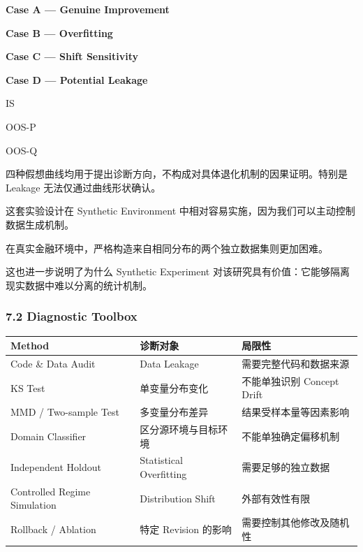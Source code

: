 \textbf{Case A --- Genuine Improvement}


\textbf{Case B --- Overfitting}


\textbf{Case C --- Shift Sensitivity}


\textbf{Case D --- Potential Leakage}


IS

OOS-P

OOS-Q

四种假想曲线均用于提出诊断方向，不构成对具体退化机制的因果证明。特别是 Leakage 无法仅通过曲线形状确认。

这套实验设计在 Synthetic Environment 中相对容易实施，因为我们可以主动控制数据生成机制。

在真实金融环境中，严格构造来自相同分布的两个独立数据集则更加困难。

这也进一步说明了为什么 Synthetic Experiment 对该研究具有价值：它能够隔离现实数据中难以分离的统计机制。

\hypertarget{part-2-23-0001-diagnostic-toolbox}{%
\subsubsection{7.2 Diagnostic Toolbox}\label{part-2-23-0001-diagnostic-toolbox}}

\begin{readertable}
\begin{longtable}[]{@{}
  >{\raggedright\arraybackslash}p{}
  >{\raggedright\arraybackslash}p{}
  >{\raggedright\arraybackslash}p{}@{}}
\toprule
Method & 诊断对象 & 局限性 \\
\midrule
\endhead
Code \& Data Audit & Data Leakage & 需要完整代码和数据来源 \\
KS Test & 单变量分布变化 & 不能单独识别 Concept Drift \\
MMD / Two-sample Test & 多变量分布差异 & 结果受样本量等因素影响 \\
Domain Classifier & 区分源环境与目标环境 & 不能单独确定偏移机制 \\
Independent Holdout & Statistical Overfitting & 需要足够的独立数据 \\
Controlled Regime Simulation & Distribution Shift & 外部有效性有限 \\
Rollback / Ablation & 特定 Revision 的影响 & 需要控制其他修改及随机性 \\
\bottomrule
\end{longtable}
\end{readertable}

